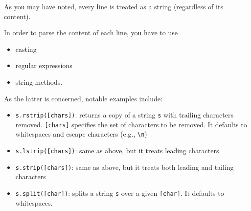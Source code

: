 \documentclass[t,handout,9pt]{beamer}
\begin{document}
\begin{frame}
\vfill
As you may have noted, every line is treated as a string (regardless of its content).

In order to parse the content of each line, you have to use
\begin{itemize}
	\item casting
	\item regular expressions
	\item string methods.
\end{itemize}
As the latter is concerned, notable examples include:
\begin{itemize}
	\item \texttt{s.rstrip([chars])}: returns a copy of a string \texttt{s} with trailing characters removed. \texttt{[chars]} specifies the set of characters to be removed. It defaults to whitespaces and escape characters (e.g., \texttt{\textbackslash n})
	\item \texttt{s.lstrip([chars])}: same as above, but it treats leading characters
	\item \texttt{s.strip([chars])}: same as above, but it treats both leading and tailing characters
	\item \texttt{s.split([char])}: splits a string \texttt{s} over a given \texttt{[char]}. It defaults to whitespaces.
\end{itemize}
\vfill
\end{frame}
\end{document}
